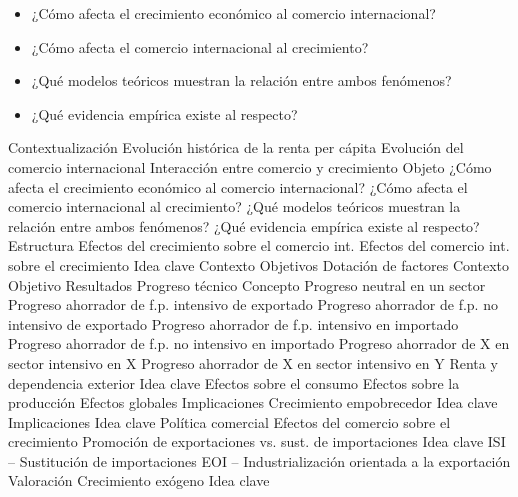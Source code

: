 \documentclass{nuevotema}
\begin{document}
\ideaclave


\begin{itemize}
	\item ¿Cómo afecta el crecimiento económico al comercio internacional?
	\item ¿Cómo afecta el comercio internacional al crecimiento?
	\item ¿Qué modelos teóricos muestran la relación entre ambos fenómenos?
	\item ¿Qué evidencia empírica existe al respecto?
\end{itemize}

\esquemacorto

\begin{esquema}[enumerate]
	\1[] 
		\2 Contextualización
			\3 Evolución histórica de la renta per cápita
			\3 Evolución del comercio internacional
			\3 Interacción entre comercio y crecimiento
		\2 Objeto
			\3 ¿Cómo afecta el crecimiento económico al comercio internacional?
			\3 ¿Cómo afecta el comercio internacional al crecimiento?
			\3 ¿Qué modelos teóricos muestran la relación entre ambos fenómenos?
			\3 ¿Qué evidencia empírica existe al respecto?
		\2 Estructura
			\3 Efectos del crecimiento sobre el comercio int.
			\3 Efectos del comercio int. sobre el crecimiento
	\1 
		\2 Idea clave
			\3 Contexto
			\3 Objetivos
		\2 Dotación de factores
			\3 Contexto
			\3 Objetivo
			\3 Resultados
		\2 Progreso técnico
			\3 Concepto
			\3 Progreso neutral en un sector
			\3 Progreso ahorrador de f.p. intensivo de exportado
			\3 Progreso ahorrador de f.p. no intensivo de exportado
			\3 Progreso ahorrador de f.p. intensivo en importado
			\3 Progreso ahorrador de f.p. no intensivo en importado
			\3 Progreso ahorrador de X en sector intensivo en X
			\3 Progreso ahorrador de X en sector intensivo en Y
		\2 Renta y dependencia exterior
			\3 Idea clave
			\3 Efectos sobre el consumo
			\3 Efectos sobre la producción
			\3 Efectos globales
			\3 Implicaciones
		\2 Crecimiento empobrecedor
			\3 Idea clave
			\3 Implicaciones
	\1 
		\2 Idea clave
			\3 Política comercial
			\3 Efectos del comercio sobre el crecimiento
		\2 Promoción de exportaciones vs. sust. de importaciones
			\3 Idea clave
			\3 ISI -- Sustitución de importaciones
			\3 EOI -- Industrialización orientada a la exportación
			\3 Valoración
		\2 Crecimiento exógeno
			\3 Idea clave

\end{esquema}
\end{document}
